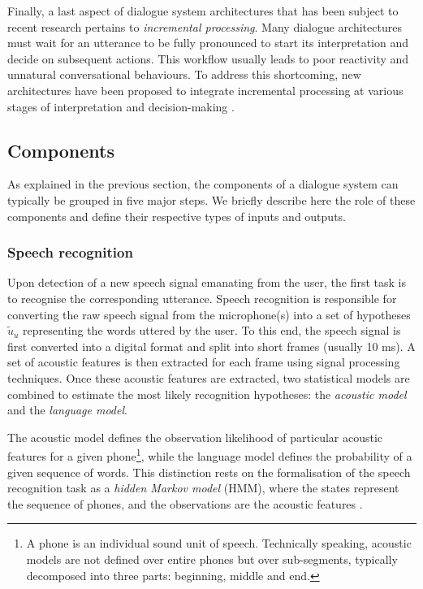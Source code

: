 Finally, a last aspect of dialogue system architectures that has been subject to recent research pertains to \textit{incremental processing}.  Many dialogue architectures must wait for an utterance to be fully pronounced to start its interpretation and decide on subsequent actions.  This workflow usually leads to poor reactivity and unnatural conversational behaviours.  To address this shortcoming, new architectures have been proposed to integrate incremental processing at various stages of interpretation and decision-making \citep{Brick:2007:INL:1228716.1228752,schlangen2009general,baumann2013:phd}.


\subsection{Components}

As explained in the previous section, the components of a dialogue system can typically be grouped in five major steps.  We briefly describe here the role of these components and define their respective types of inputs and outputs.

\subsubsection*{Speech recognition}
Upon detection of a new speech signal emanating from the user, the first task is to recognise the corresponding utterance. Speech recognition is responsible for converting the raw speech signal from the microphone(s) into a set of hypotheses $\tilde{u}_u$ representing the words uttered by the user. To this end, the speech signal is first converted into a digital format and split into short frames (usually 10 ms). A set of acoustic features is then extracted for each frame using signal processing techniques.  Once these acoustic features are extracted, two statistical models are combined to estimate the most likely recognition hypotheses: the \textit{acoustic model} and the \textit{language model}.  

The acoustic model defines the observation likelihood of particular acoustic features for a given phone\footnote{A phone is an individual sound unit of speech.  Technically speaking, acoustic models are not defined over entire phones but over sub-segments, typically decomposed into three parts: beginning, middle and end.}, while the language model defines the probability of a given sequence of words. This distinction rests on the formalisation of the speech recognition task as a \textit{hidden Markov model} (HMM), where the states represent the sequence of phones, and the observations are the acoustic features \citep{JuangRabiner:91}. 

